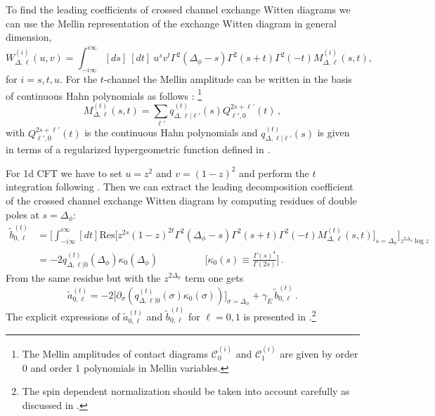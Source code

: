\documentclass[12pt]{article}
\numberwithin{equation}{section}
\newcommand{\be}{\begin{equation}}
\newcommand{\ee}{\end{equation}}
\def\s{\sigma}
\def\k{\kappa}
\def\D{\Delta}
\begin{document}
To find the leading coefficients of crossed channel exchange Witten diagrams we can use the Mellin representation of the exchange Witten diagram in general dimension,
\begin{equation}
W^{(i)}_{\Delta,\ell}(u,v)=\int_{-i \infty}^{i \infty}[ds]~ [dt]~u^s v^t \Gamma^2(\Delta_\phi-s)\Gamma^2(s+t)\Gamma^2(-t) M^{(i)}_{\Delta,\ell}(s,t),
\end{equation}
for $i=s,t,u$. For the $t$-channel the Mellin amplitude can be written in the basis of continuous Hahn polynomials as follows \cite{Gopakumar:2018xqi}: \footnote{The Mellin amplitudes of contact diagrams $\mathcal C_{0}^{(i)}$ and $\mathcal C_{1}^{(i)}$ are given by order 0 and order 1 polynomials in Mellin variables.}
\begin{equation}
M^{(t)}_{\Delta,\ell}(s,t)=\sum_{\ell'} q^{(t)}_{\D, \ell |\ell'}(s) Q_{\ell', 0}^{2 s+\ell'}(t)\,,
\end{equation}
with $Q_{\ell', 0}^{2 s+\ell'}(t)$ is the continuous Hahn polynomials and $q^{(t)}_{\D,\ell|\ell'}(s)$ is given in terms of a regularized hypergeometric function defined in \cite{Ferrero:2019luz}.

For 1d CFT we have to set $u=z^2$ and $v=(1-z)^2$ and perform the $t$ integration following \cite{Ferrero:2019luz}. Then we can extract the leading decomposition coefficient of the crossed channel exchange Witten diagram  by computing  residues of double poles at $s=\Delta_{\phi}$: 
\begin{align}
\widetilde{b}_{0,\ell}^{(t)}&=\bigg[\int_{-i \infty}^{i \infty} [dt]\text{Res}\big[z^{2s}(1-z)^{2t} \Gamma^2(\Delta_\phi-s)\Gamma^2(s+t)\Gamma^2(-t) M^{(t)}_{\Delta,\ell}(s,t)\big]_{s=\D_\phi} \bigg]_{z^{2\D_\phi}\log z}\nonumber \\
&=-2q^{(t)}_{\D,\ell|0}(\D_\phi) \k_0(\D_\phi) \hspace{2cm} \Bigg[\k_{0}(s)\equiv \frac{\Gamma(s)^4}{\Gamma(2s)}\Bigg]\,.
\end{align}
From the same residue but with the $z^{2\D_\phi}$ term one gets
\be
\widetilde{a}_{0,\ell}^{(t)}=-2 \big[\partial_{\s}(q^{(t)}_{\D,\ell|0}(\s) \k_0(\s))\big]_{\s=\D_\phi} +\gamma_E 	\, \widetilde{b}_{0,\ell}^{(t)}    \,.
\ee	
The explicit expressions of $\widetilde{a}_{0,\ell}^{(t)}$ and $\widetilde{b}_{0,\ell}^{(t)}$ for $\ell=0,1$ is presented in \cite{notebook}.\footnote{The spin dependent normalization should be taken into account carefully as discussed in \cite{Ferrero:2019luz}.}
	
	
	
	
	
	
	
\small
\parskip=-10pt


	
	
	

	
	
\end{document}
